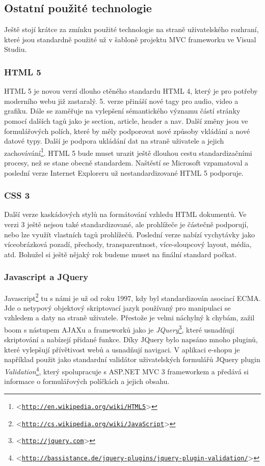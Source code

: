 \documentclass[11pt,twoside,a4paper]{book}
\let\oldUrl\url
\renewcommand\url[1]{<\texttt{\oldUrl{#1}}>}
\begin{document}
\subsection{Ostatní použité technologie}
Ještě stojí krátce za zmínku použité technologie na straně uživatelského rozhraní, které jsou standardně použité už v šabloně projektu MVC frameworku ve Visual Studiu.

\subsubsection*{HTML 5}
HTML 5 je novou verzí dlouho ctěného standardu HTML 4, který je pro potřeby moderního webu již zastaralý. 5. verze přináší nové tagy pro audio, video a grafiku. Dále se zaměřuje na vylepšení sémantického významu částí stránky pomocí dalších tagů jako je section, article, header a nav. Další změny jsou ve formulářových polích, které by měly podporovat nové způsoby vkládání a nové datové typy. Další je podpora ukládání dat na straně uživatele a jejich zachovávání\footnote{\url{http://en.wikipedia.org/wiki/HTML5}}. HTML 5 bude muset urazit ještě dlouhou cestu standardizačními procesy, než se stane obecně standardem. Naštěstí se Microsoft vzpamatoval a poslední verze Internet Exploreru už nestandardizované HTML 5 podporuje.

\subsubsection*{CSS 3}
Další verze kaskádových stylů na formátování vzhledu HTML dokumentů. Ve verzi 3 ještě nejsou také standardizované, ale prohlížeče je částečně podporují, nebo lze využít vlastních tagů prohlížečů. Poslední verze nabízí vychytávky jako víceobrázková pozadí, přechody, transparentnost, více-sloupcový layout, média, atd. Bohužel si ještě nějaký rok budeme muset na finální standard počkat.

\subsubsection*{Javascript a JQuery}
Javascript\footnote{\url{http://cs.wikipedia.org/wiki/JavaScript}} tu s námi je už od roku 1997, kdy byl standardizován asociací ECMA. Jde o netypový objektový skriptovací jazyk používaný pro manipulaci se vzhledem a daty na straně uživatele. Přestože je velmi náchylný k chybám, zažil boom s nástupem AJAXu a frameworků jako je \textit{JQuery}\footnote{\url{http://jquery.com}}, které usnadňují skriptování a nabízejí přidané funkce. Díky JQuery bylo napsáno mnoho pluginů, které vylepšují přívětivost webů a usnadňují navigaci. V aplikaci e-shopu je například použit jako standardní validátor uživatelských formulářů JQuery plugin \textit{Validation}\footnote{\url{http://bassistance.de/jquery-plugins/jquery-plugin-validation/}}, který spolupracuje s ASP.NET MVC 3 frameworkem a předává si informace o formulářových políčkách a jejich obsahu.
\end{document}
